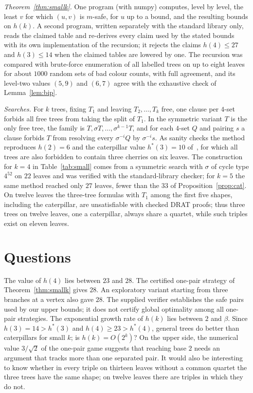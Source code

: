 \documentclass[11pt]{amsart}
\theoremstyle{remark}
\begin{document}
\emph{Theorem~\ref{thm:smallk}.} One program (with numpy) computes, level by level, the least $v$ for which $(u,v)$ is $m$-safe, for $u$ up to a bound, and the resulting bounds on $h(k)$. A second program, written separately with the standard library only, reads the claimed table and re-derives every claim used by the stated bounds with its own implementation of the recursion; it rejects the claims $h(4)\le27$ and $h(3)\le14$ when the claimed tables are lowered by one. The recursion was compared with brute-force enumeration of all labelled trees on up to eight leaves for about $1000$ random sets of bad colour counts, with full agreement, and its level-two values $(5,9)$ and $(6,7)$ agree with the exhaustive check of Lemma~\ref{lem:bip}.

\emph{Searches.} For $k$ trees, fixing $T_1$ and leaving $T_2,\dots,T_k$ free, one clause per $4$-set forbids all free trees from taking the split of $T_1$. In the symmetric variant $T$ is the only free tree, the family is $T,\sigma T,\dots,\sigma^{k-1}T$, and for each $4$-set $Q$ and pairing $s$ a clause forbids $T$ from resolving every $\sigma^{-i}Q$ by $\sigma^{-i}s$. As sanity checks the method reproduces $h(2)=6$ and the caterpillar value $h^*(3)=10$ of~\cite{SY2026}, for which all trees are also forbidden to contain three cherries on six leaves. The construction for $k=4$ in Table~\ref{tab:small} comes from a symmetric search with $\sigma$ of cycle type $4^52$ on $22$ leaves and was verified with the standard-library checker; for $k=5$ the same method reached only $27$ leaves, fewer than the $33$ of Proposition~\ref{prop:cat}. On twelve leaves the three-tree formulas with $T_1$ among the first five shapes, including the caterpillar, are unsatisfiable with checked DRAT proofs; thus three trees on twelve leaves, one a caterpillar, always share a quartet, while such triples exist on eleven leaves.

\section{Questions}

The value of $h(4)$ lies between $23$ and $28$. The certified one-pair strategy of Theorem~\ref{thm:smallk} gives $28$. An exploratory variant starting from three branches at a vertex also gave $28$. The supplied verifier establishes the safe pairs used by our upper bounds; it does not certify global optimality among all one-pair strategies. The exponential growth rate of $h(k)$ lies between $2$ and $\beta$. Since $h(3)=14>h^*(3)$ and $h(4)\ge23>h^*(4)$, general trees do better than caterpillars for small $k$; is $h(k)=O(2^k)$? On the upper side, the numerical value $3/\sqrt2$ of the one-pair game suggests that reaching base $2$ needs an argument that tracks more than one separated pair. It would also be interesting to know whether in every triple on thirteen leaves without a common quartet the three trees have the same shape; on twelve leaves there are triples in which they do not.
\end{document}
